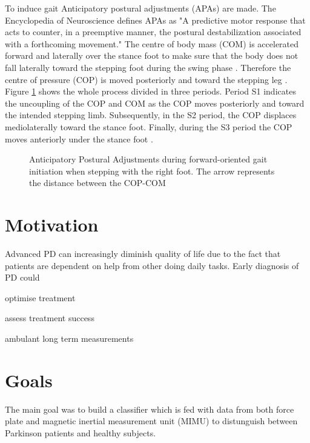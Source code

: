 To induce gait Anticipatory postural adjustments (APAs) are made. The Encyclopedia of Neuroscience \cite[p.133]{woollacott_anticipatory_2009} defines APAs as "A predictive motor response that acts to counter, in a preemptive manner, the postural destabilization associated with a forthcoming movement." The centre of body mass (COM) is accelerated forward and laterally over the stance foot to make sure that the body does not fall laterally toward the stepping foot during the swing phase \cite{woollacott_anticipatory_2009}. Therefore the centre of pressure (COP) is moved posteriorly and toward the stepping leg \cite{mancini_anticipatory_2009}. Figure \ref{fig:APAoverview} shows the whole process divided in three periods. Period S1 indicates the uncoupling of the COP and COM as the COP moves posteriorly and toward the intended stepping limb. Subsequently, in the S2 period, the COP displaces mediolaterally toward the stance foot. Finally, during the S3 period the COP moves anteriorly under the stance foot \cite{hass_gait_2005-1}.

\begin{figure}
	\centering
	\caption{Anticipatory Postural Adjustments during forward-oriented gait initiation when stepping with the right foot. The arrow represents the distance between the COP-COM \cite{hass_gait_2005-1}}
	\label{fig:APAoverview}
\end{figure}


\section{Motivation}

Advanced PD can increasingly diminish quality of life due to the fact that patients are dependent on help from other doing daily tasks. Early diagnosis of PD could 

optimise treatment

assess treatment success

ambulant long term measurements


\section{Goals}

The main goal was to build a classifier which is fed with data from both force plate and magnetic inertial measurement unit (MIMU) to distunguish between Parkinson patients and healthy subjects.


